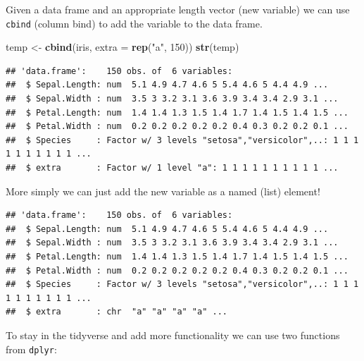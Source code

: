 \documentclass[
]{book}
\newenvironment{Shaded}{\begin{snugshade}}{\end{snugshade}}
\newcommand{\DataTypeTok}[1]{\textcolor[rgb]{0.13,0.29,0.53}{#1}}
\newcommand{\DecValTok}[1]{\textcolor[rgb]{0.00,0.00,0.81}{#1}}
\newcommand{\KeywordTok}[1]{\textcolor[rgb]{0.13,0.29,0.53}{\textbf{#1}}}
\newcommand{\NormalTok}[1]{#1}
\newcommand{\OperatorTok}[1]{\textcolor[rgb]{0.81,0.36,0.00}{\textbf{#1}}}
\newcommand{\StringTok}[1]{\textcolor[rgb]{0.31,0.60,0.02}{#1}}
\theoremstyle{definition}
\theoremstyle{definition}
\theoremstyle{definition}
\theoremstyle{remark}
\begin{document}
Given a data frame and an appropriate length vector (new variable) we can use \texttt{cbind} (column bind) to add the variable to the data frame.

\begin{Shaded}
\begin{Highlighting}[]
\NormalTok{temp <-}\StringTok{ }\KeywordTok{cbind}\NormalTok{(iris, }\DataTypeTok{extra =} \KeywordTok{rep}\NormalTok{(}\StringTok{"a"}\NormalTok{, }\DecValTok{150}\NormalTok{))}
\KeywordTok{str}\NormalTok{(temp)}
\end{Highlighting}
\end{Shaded}

\begin{verbatim}
## 'data.frame':    150 obs. of  6 variables:
##  $ Sepal.Length: num  5.1 4.9 4.7 4.6 5 5.4 4.6 5 4.4 4.9 ...
##  $ Sepal.Width : num  3.5 3 3.2 3.1 3.6 3.9 3.4 3.4 2.9 3.1 ...
##  $ Petal.Length: num  1.4 1.4 1.3 1.5 1.4 1.7 1.4 1.5 1.4 1.5 ...
##  $ Petal.Width : num  0.2 0.2 0.2 0.2 0.2 0.4 0.3 0.2 0.2 0.1 ...
##  $ Species     : Factor w/ 3 levels "setosa","versicolor",..: 1 1 1 1 1 1 1 1 1 1 ...
##  $ extra       : Factor w/ 1 level "a": 1 1 1 1 1 1 1 1 1 1 ...
\end{verbatim}

More simply we can just add the new variable as a named (list) element!

\begin{Shaded}
\end{Shaded}

\begin{verbatim}
## 'data.frame':    150 obs. of  6 variables:
##  $ Sepal.Length: num  5.1 4.9 4.7 4.6 5 5.4 4.6 5 4.4 4.9 ...
##  $ Sepal.Width : num  3.5 3 3.2 3.1 3.6 3.9 3.4 3.4 2.9 3.1 ...
##  $ Petal.Length: num  1.4 1.4 1.3 1.5 1.4 1.7 1.4 1.5 1.4 1.5 ...
##  $ Petal.Width : num  0.2 0.2 0.2 0.2 0.2 0.4 0.3 0.2 0.2 0.1 ...
##  $ Species     : Factor w/ 3 levels "setosa","versicolor",..: 1 1 1 1 1 1 1 1 1 1 ...
##  $ extra       : chr  "a" "a" "a" "a" ...
\end{verbatim}

To stay in the tidyverse and add more functionality we can use two functions from \texttt{dplyr}:
\end{document}
